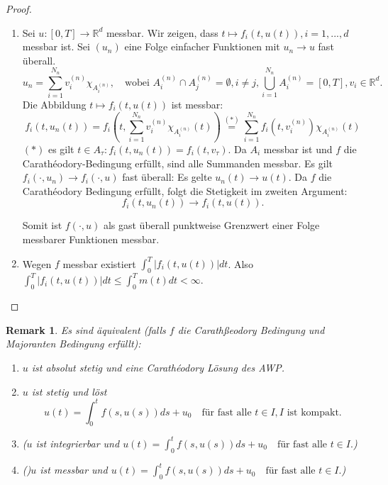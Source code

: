 \documentclass[a4paper, 11pt]{article}
\newtheorem*{remark}{Remark}
\begin{document}
\begin{proof}
	\begin{enumerate}
		\item Sei $u: [0,T] \to \mathbb R^d$ messbar. Wir zeigen, dass $t \mapsto f_i(t,u(t)), i = 1,...,d$ messbar ist. Sei $(u_n)$ eine Folge einfacher Funktionen mit $u_n \to u$ fast überall.
		\[
		u_n = \sum^{N_n}_{i=1} v_i^{(n)} \chi_{A_i^{(n)}}, \quad \text{wobei $A_i^{(n)} \cap A_j^{(n)} = \emptyset, i \neq j, \bigcup_{i=1}^{N_n}A_i^{(n)} = [0,T], v_i \in \mathbb R^d$.}
		\] 
		Die Abbildung $t \mapsto f_i(t,u(t))$ ist messbar:
		\[
		f_i(t,u_n(t)) 
		= f_i(t, \sum^{N_n}_{i = 1}v_i^{(n)} \chi_{A_i^{(n)}}(t)) 
		\overset{(*)}{=} \sum^{N_n}_{i=1}f_i(t,v_i^{(n)})\chi_{A_i^{(n)}}(t)
		\]
		$(*)$ es gilt $t \in A_{\tau}: f_i(t,u_n(t)) = f_i(t,v_{\tau}).$ Da $A_i$ messbar ist und $f$ die Carathéodory-Bedingung erfüllt, sind alle Summanden messbar. Es gilt $f_i(\cdot, u_n) \to f_i(\cdot, u)$ fast überall: Es gelte $u_n(t) \to u(t)$. Da $f$ die Carathéodory Bedingung erfüllt, folgt die Stetigkeit im zweiten Argument:
		\[
		f_i(t,u_n(t)) \to f_i(t,u(t)).
		\]
		
		Somit ist $f(\cdot, u)$ als gast überall punktweise Grenzwert einer Folge messbarer Funktionen messbar.
		
		\item Wegen $f$ messbar existiert $\int^T_{0}|f_i(t,u(t))| dt$. Also $\int^T_{0}|f_i(t,u(t))| dt \leq \int^T_0 m(t)dt < \infty.$ 
	\end{enumerate}
\end{proof}

\begin{remark}
	Es sind äquivalent (falls $f$ die Carathßeodory Bedingung und Majoranten Bedingung erfüllt):
	\begin{enumerate}
		\item $u$ ist absolut stetig und eine Carathéodory Lösung des AWP.
		\item $u$ ist stetig und löst 
		\[
		u(t) = \int^t_0 f(s,u(s)) ds + u_0 \quad \text{für fast alle $t \in I, I$ ist kompakt.}
		\]
		
		\item ($u$ ist integrierbar und $			u(t) = \int^t_0 f(s,u(s)) ds + u_0 \quad \text{für fast alle $t \in I$.}$)
		
		\item ()$u$ ist messbar und $			u(t) = \int^t_0 f(s,u(s)) ds + u_0 \quad \text{für fast alle $t \in I$.}$)
	\end{enumerate}
\end{remark}
\end{document}
